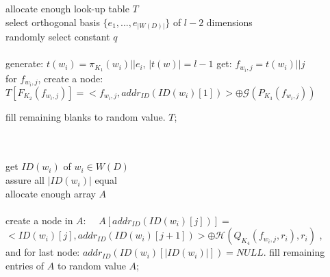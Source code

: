 \begin{algorithm}[!htb]
\caption{$T \leftarrow BuildLookup(D,K)$}
\label{alg:BuildLookup}
\begin{algorithmic} [1]

\ENSURE ~~\\
   ~~\\
  \STATE allocate enough look-up table $T$ ~~\\
         select orthogonal basis $\{e_1, ..., e_{|W(D)|} \}$ of $l-2$ dimensions ~~\\
         randomly select constant $q$ ~~\\
   ~~\\
           \STATE generate: $t(w_i) = \pi_{K_1}(w_i) || e_i$, $|t(w)| = l-1$
             \STATE get: $f_{w_i,j} = t(w_i) || j$ ~~\\
             \STATE for $f_{w_i,j}$, create a node: ~~\\
                    $T[F_{K_2}(f_{w_i,j})] = <f_{w_i,j}, addr_{ID}(ID(w_i)[1])> \oplus \mathcal{G}(P_{K_3}(f_{w_i,j}))$

           \ENDFOR
         \ENDFOR
         \STATE fill remaining blanks to random value.
  \RETURN ${T}$;
\end{algorithmic}
\end{algorithm}

\begin{algorithm}[!htb]
\caption{$A \leftarrow BuildArray(D,K)$}
\label{alg:BuildArray}
\begin{algorithmic} [1]

\ENSURE ~~\\
   ~~\\
  \STATE get $ID(w_i)$ of $w_i \in W(D)$ ~~\\
         assure all $|ID(w_i)|$ equal ~~\\
         allocate enough array $A$ ~~\\
   ~~\\
             \STATE create a node in $A$:  \ \ $A[addr_{ID}(ID(w_i)[j])] = $ ~~\\
                    $<ID(w_i)[j], addr_{ID}(ID(w_i)[j+1])> \oplus \mathcal{H}(Q_{K_4}(f_{w_i,j},r_i), r_i)$ , ~~\\
                    and for last node: $addr_{ID}(ID(w_i)[|ID(w_i)|]) = NULL$.
           \ENDFOR
         \ENDFOR
         \STATE fill remaining entries of $A$ to random value
  \RETURN ${A}$;

\end{algorithmic}
\end{algorithm}


